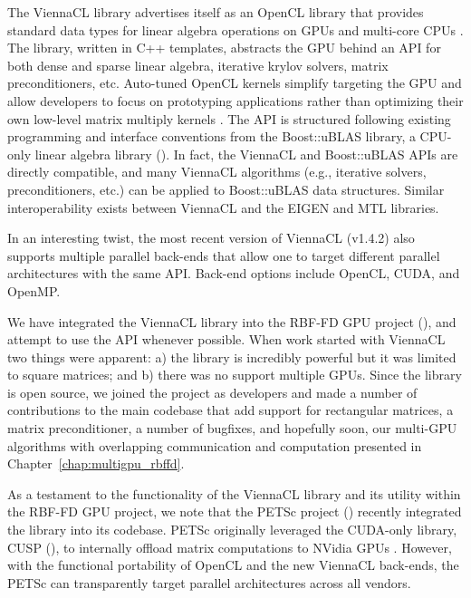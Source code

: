 \documentclass{report}
\begin{document}
The ViennaCL library advertises itself as an OpenCL library that provides standard data types for linear algebra operations on GPUs and multi-core CPUs \cite{Rupp2010}. The library, written in C++ templates, abstracts the GPU behind an API for both dense and sparse linear algebra, iterative krylov solvers, matrix preconditioners, etc. Auto-tuned OpenCL kernels simplify targeting the GPU and allow developers to focus on prototyping applications rather than optimizing their own low-level matrix multiply kernels \cite{Rupp2010a}. 
The API is structured following existing programming and interface conventions from the Boost::uBLAS library, a CPU-only linear algebra library (\cite{BoostSite}). In fact, the ViennaCL and Boost::uBLAS APIs are directly compatible, and many ViennaCL algorithms (e.g., iterative solvers, preconditioners, etc.) can be applied to Boost::uBLAS data structures. Similar interoperability exists between ViennaCL and the EIGEN and MTL libraries. 

In an interesting twist, the most recent version of ViennaCL (v1.4.2) also supports multiple parallel back-ends that allow one to target different parallel architectures with the same API. Back-end options include OpenCL, CUDA, and OpenMP. 

We have integrated the ViennaCL library into the RBF-FD GPU project (\cite{BolligRBFFDCode}), and attempt to use the API whenever possible. When work started with ViennaCL two things were apparent: a) the library is incredibly powerful but it was limited to square matrices; and b) there was no support multiple GPUs. Since the library is open source, we joined the project as developers and made a number of contributions to the main codebase that add support for rectangular matrices, a matrix preconditioner, a number of bugfixes, and hopefully soon, our multi-GPU algorithms with overlapping communication and computation presented in Chapter~\ref{chap:multigpu_rbffd}.

As a testament to the functionality of the ViennaCL library and its utility within the RBF-FD GPU project, we note that the PETSc project (\cite{petsc-web-page}) recently integrated the library into its codebase. PETSc originally leveraged the CUDA-only library, CUSP (\cite{Cusp2012}), to internally offload matrix computations to NVidia GPUs \cite{Minden2010}. However, with the functional portability of OpenCL and the new ViennaCL back-ends, the PETSc can transparently target parallel architectures across all vendors. 
\end{document}
